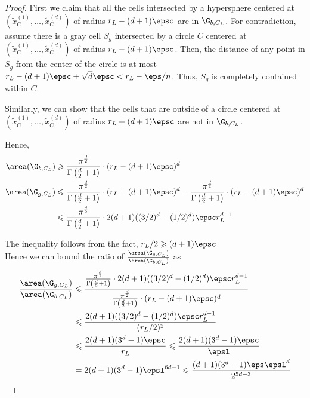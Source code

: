 \documentclass[10pt,a4paper]{article}
\theoremstyle{plain}
\theoremstyle{plain}
\theoremstyle{plain}
\theoremstyle{definition}
\begin{document}
{\begin{proof}
		First we claim that all the cells intersected by a hypersphere centered at  \((\tilde{x}_{C}^{(1)},\dots,\tilde{x}_{C}^{(d)})\) of radius $r_L- (d+1)\epsc$ are in $\G_{b, C_L}$. 
		For contradiction, assume there is a gray cell $S_g$ intersected by a circle $C$ centered at  \((\tilde{x}_{C}^{(1)},\dots,\tilde{x}_{C}^{(d)})\) of radius $r_L- (d+1)\epsc$.
		Then, the distance of any point in $S_g$ from the center of the circle is at most $r_L- (d+1)\epsc +\sqrt{d}\epsc < r_L-\eps/n$. Thus, $S_g$  is completely contained within $C$.
		
		Similarly, we can show that the cells that are outside of a circle centered at  \((\tilde{x}_{C}^{(1)},\dots,\tilde{x}_{C}^{(d)})\) of radius $r_L+ (d+1)\epsc$ are not in $\G_{b, C_L}$.
		
		Hence, 
		\begin{align*}
		\area(\G_{b, C_L}) &\geqslant \frac{\pi^{\frac{d}{2}}}{\Gamma\left(\frac{d}{2} + 1\right)} \cdot (r_L-(d+1)\epsc)^d \\
		\area(\G_{g, C_L}) &\leqslant \frac{\pi^{\frac{d}{2}}}{\Gamma\left(\frac{d}{2} + 1\right)} \cdot (r_L+(d+1)\epsc)^d - \frac{\pi^{\frac{d}{2}}}{\Gamma\left(\frac{d}{2} + 1\right)} \cdot (r_L-(d+1)\epsc)^d \\ 
		&\leqslant \frac{\pi^{\frac{d}{2}}}{\Gamma\left(\frac{d}{2} + 1\right)} \cdot 2(d+1)((3/2)^d-(1/2)^d)\epsc r_{L}^{d-1}
		\end{align*}

		The inequality follows from the fact, \(r_{L}/2\geqslant(d+1)\epsc\)\\
		
		Hence we can bound the ratio of \(\frac{\area(\G_{g, C_L})}{\area(\G_{b, C_L})}\) as
		\[
		\begin{aligned}
		\frac{\area(\G_{g, C_L})}{\area(\G_{b, C_L})} &\leqslant \frac{\frac{\pi^{\frac{d}{2}}}{\Gamma\left(\frac{d}{2} + 1\right)} \cdot 2(d+1)((3/2)^d-(1/2)^d)\epsc r_{L}^{d-1}}{\frac{\pi^{\frac{d}{2}}}{\Gamma\left(\frac{d}{2} + 1\right)} \cdot (r_L-(d+1)\epsc)^d} \\
		&\leqslant \frac{2(d+1)((3/2)^d-(1/2)^d)\epsc r_{L}^{d-1}}{(r_L/2)^2} \\
		&\leqslant \frac{2(d+1)(3^d-1)\epsc}{r_L} \leqslant \frac{2(d+1)(3^d-1)\epsc}{\epsl} \\
		&= 2(d+1)(3^d-1)\epsl^{6d-1} \leqslant \frac{(d+1)(3^d-1)\eps\epsl^d}{2^{5d-3}}
		\end{aligned}
		\]
		

\end{proof}}
\end{document}
